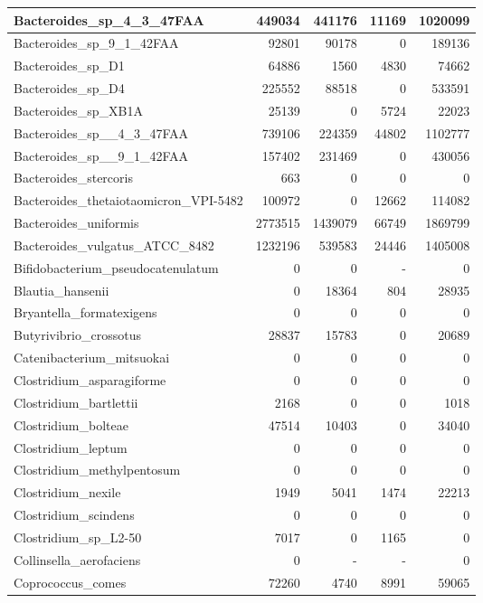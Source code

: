 \documentclass[12pt,a4paper]{article}
\begin{document}
\begin{table}[ht]
\begin{center}
\begin{tabular}{|l*{4}{|r}|}
Bacteroides\_sp\_4\_3\_47FAA & 449034 & 441176 & 11169 & 1020099 \\ \hline
Bacteroides\_sp\_9\_1\_42FAA & 92801 & 90178 & 0 & 189136 \\ \hline
Bacteroides\_sp\_D1 & 64886 & 1560 & 4830 & 74662 \\ \hline
Bacteroides\_sp\_D4 & 225552 & 88518 & 0 & 533591 \\ \hline
Bacteroides\_sp\_XB1A & 25139 & 0 & 5724 & 22023 \\ \hline
Bacteroides\_sp\_\_4\_3\_47FAA & 739106 & 224359 & 44802 & 1102777 \\ \hline
Bacteroides\_sp\_\_9\_1\_42FAA & 157402 & 231469 & 0 & 430056 \\ \hline
Bacteroides\_stercoris & 663 & 0 & 0 & 0 \\ \hline
Bacteroides\_thetaiotaomicron\_VPI-5482 & 100972 & 0 & 12662 & 114082 \\ \hline
Bacteroides\_uniformis & 2773515 & 1439079 & 66749 & 1869799 \\ \hline
Bacteroides\_vulgatus\_ATCC\_8482 & 1232196 & 539583 & 24446 & 1405008 \\ \hline
Bifidobacterium\_pseudocatenulatum & 0 & 0 & - & 0 \\ \hline
Blautia\_hansenii & 0 & 18364 & 804 & 28935 \\ \hline
Bryantella\_formatexigens & 0 & 0 & 0 & 0 \\ \hline
Butyrivibrio\_crossotus & 28837 & 15783 & 0 & 20689 \\ \hline
Catenibacterium\_mitsuokai & 0 & 0 & 0 & 0 \\ \hline
Clostridium\_asparagiforme & 0 & 0 & 0 & 0 \\ \hline
Clostridium\_bartlettii & 2168 & 0 & 0 & 1018 \\ \hline
Clostridium\_bolteae & 47514 & 10403 & 0 & 34040 \\ \hline
Clostridium\_leptum & 0 & 0 & 0 & 0 \\ \hline
Clostridium\_methylpentosum & 0 & 0 & 0 & 0 \\ \hline
Clostridium\_nexile & 1949 & 5041 & 1474 & 22213 \\ \hline
Clostridium\_scindens & 0 & 0 & 0 & 0 \\ \hline
Clostridium\_sp\_L2-50 & 7017 & 0 & 1165 & 0 \\ \hline
Collinsella\_aerofaciens & 0 & - & - & 0 \\ \hline
Coprococcus\_comes & 72260 & 4740 & 8991 & 59065 \\ \hline

\end{tabular}
\end{center}
\end{table}
\end{document}
